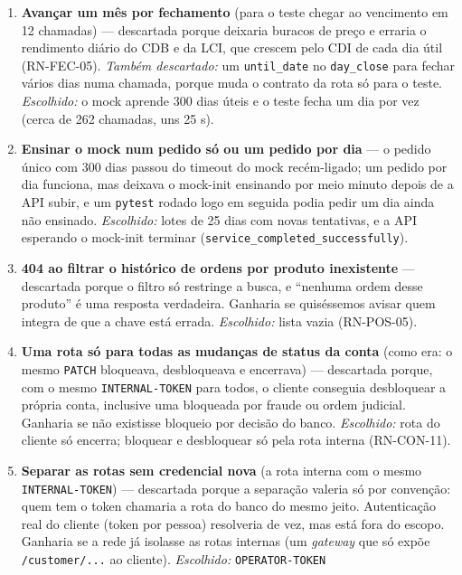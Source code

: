\documentclass[11pt,a4paper]{article}
\newcommand{\tb}[1]{\texttt{#1}}           %
\begin{document}
\begin{enumerate}
  \tb{reference_rate} pela data de movimento. A diferença em dinheiro é mínima (o CDI quase não
  muda de um dia para o outro). \emph{Escolhido:} o CDI do dia que fecha, lido da tabela
  (RN-FEC-05).
  \item \textbf{Avançar um mês por fechamento} (para o teste chegar ao vencimento em 12 chamadas)
  --- descartada porque deixaria buracos de preço e erraria o rendimento diário do CDB e da LCI,
  que crescem pelo CDI de cada dia útil (RN-FEC-05). \emph{Também descartado:} um
  \tb{until_date} no \tb{day_close} para fechar vários dias numa chamada, porque muda o contrato
  da rota só para o teste. \emph{Escolhido:} o mock aprende 300 dias úteis e o teste fecha um dia
  por vez (cerca de 262 chamadas, uns 25 s).
  \item \textbf{Ensinar o mock num pedido só ou um pedido por dia} --- o pedido único com 300 dias
  passou do timeout do mock recém-ligado; um pedido por dia funciona, mas deixava o mock-init
  ensinando por meio minuto depois de a API subir, e um \tb{pytest} rodado logo em seguida podia
  pedir um dia ainda não ensinado. \emph{Escolhido:} lotes de 25 dias com novas tentativas, e a
  API esperando o mock-init terminar (\tb{service_completed_successfully}).
  \item \textbf{404 ao filtrar o histórico de ordens por produto inexistente} --- descartada porque
  o filtro só restringe a busca, e ``nenhuma ordem desse produto'' é uma resposta verdadeira.
  Ganharia se quiséssemos avisar quem integra de que a chave está errada. \emph{Escolhido:} lista
  vazia (RN-POS-05).
  \item \textbf{Uma rota só para todas as mudanças de status da conta} (como era: o mesmo
  \tb{PATCH} bloqueava, desbloqueava e encerrava) --- descartada porque, com o mesmo
  \tb{INTERNAL-TOKEN} para todos, o cliente conseguia desbloquear a própria conta, inclusive uma
  bloqueada por fraude ou ordem judicial. Ganharia se não existisse bloqueio por decisão do banco.
  \emph{Escolhido:} rota do cliente só encerra; bloquear e desbloquear só pela rota interna
  (RN-CON-11).
  \item \textbf{Separar as rotas sem credencial nova} (a rota interna com o mesmo
  \tb{INTERNAL-TOKEN}) --- descartada porque a separação valeria só por convenção: quem tem o token
  chamaria a rota do banco do mesmo jeito. Autenticação real do cliente (token por pessoa) resolveria
  de vez, mas está fora do escopo. Ganharia se a rede já isolasse as rotas internas (um
  \emph{gateway} que só expõe \tb{/customer/...} ao cliente). \emph{Escolhido:} \tb{OPERATOR-TOKEN}

\end{enumerate}
\end{document}

